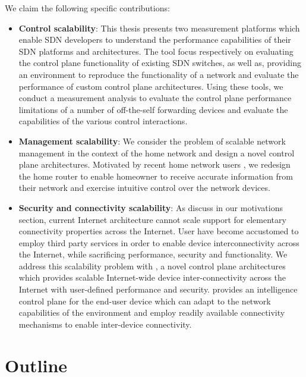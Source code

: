 We claim the following specific contributions:

\begin{itemize}
  \item \textbf{Control scalability}: This thesis presents two measurement
        platforms which enable SDN developers to understand the performance
        capabilities of their SDN platforms and architectures. The tool focus
        respectively on evaluating the control plane functionality of existing
        SDN switches, as well as, providing an environment to reproduce the
        functionality of a network and evaluate the performance of custom
        control plane architectures. Using these tools, we conduct a measurement
        analysis to evaluate the control plane performance limitations of a
        number of off-the-self forwarding devices and evaluate the capabilities
        of the various control interactions. 
  \item \textbf{Management scalability}: We consider the problem of scalable
        network management in the context of the home network and design a novel
        control plane architectures. Motivated by recent home network users , we
        redesign the home router to enable homeowner to receive accurate
        information from their network and exercise intuitive control over the
        network devices.
  \item \textbf{Security and connectivity scalability}: As discuss in our
        motivations section, current Internet architecture cannot scale support
        for elementary connectivity properties across the Internet. User have
        become accustomed to employ third party services in order to enable
        device interconnectivity across the Internet, while sacrificing
        performance, security and functionality. We address this scalability
        problem with \signpost, a novel control plane architectures which
        provides scalable Internet-wide device inter-connectivity across the
        Internet with user-defined performance and security. \signpost provides
        an intelligence control plane for the end-user device which can adapt to
        the network capabilities of the environment and employ readily available
        connectivity mechanisms to enable inter-device connectivity. 
\end{itemize}

\section{Outline} \label{sec:intro:outline}

